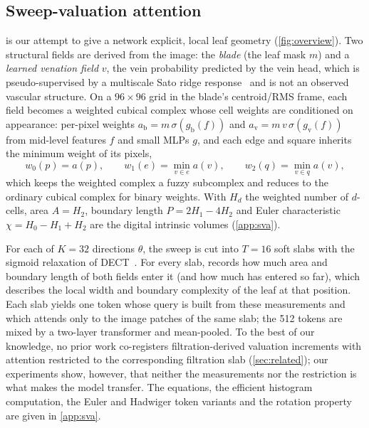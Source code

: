 \subsection{Sweep-valuation attention}
\label{sec:sva}
\SVA{} is our attempt to give a network explicit, local leaf geometry (\cref{fig:overview}). Two
structural fields are derived from the image: the \emph{blade} (the leaf mask $m$) and a \emph{learned
venation field} $v$, the vein probability predicted by the vein head, which is pseudo-supervised by a
multiscale Sato ridge response~\citep{sato1998ridge} and is not an observed vascular structure. On a
$96\times96$ grid in the blade's centroid/RMS frame, each field becomes a weighted cubical complex whose
cell weights are conditioned on appearance: per-pixel weights $a_{\mathrm b}=m\,\sigma(g_{\mathrm b}(f))$
and $a_{\mathrm v}=m\,v\,\sigma(g_{\mathrm v}(f))$ from mid-level features $f$ and small MLPs $g$, and
each edge and square inherits the minimum weight of its pixels,
\begin{equation}
  w_0(p)=a(p),\qquad w_1(e)=\min_{v\in e}a(v),\qquad w_2(q)=\min_{v\in q}a(v),
  \label{eq:weights}
\end{equation}
which keeps the weighted complex a fuzzy subcomplex and reduces to the ordinary cubical complex for
binary weights. With $H_d$ the weighted number of $d$-cells, area $A=H_2$, boundary length
$P=2H_1-4H_2$ and Euler characteristic $\chi=H_0-H_1+H_2$ are the digital intrinsic volumes
(\cref{app:sva}).

For each of $K{=}32$ directions $\theta$, the sweep is cut into $T{=}16$ soft slabs with the sigmoid
relaxation of DECT~\citep{roell2024dect}. For every slab, \SVA{} records how much area and boundary
length of both fields enter it (and how much has entered so far), which describes the local width and
boundary complexity of the leaf at that position. Each slab yields one token whose query is built from
these measurements and which attends only to the image patches of the same slab; the 512 tokens are
mixed by a two-layer transformer and mean-pooled. To the best of our knowledge, no prior work
co-registers filtration-derived valuation increments with attention restricted to the corresponding
filtration slab (\cref{sec:related}); our experiments show, however, that neither the measurements nor
the restriction is what makes the model transfer. The equations, the efficient histogram
computation, the Euler and Hadwiger token variants and the rotation property are given in
\cref{app:sva}.

